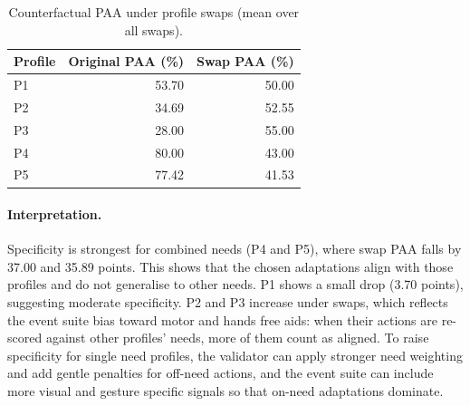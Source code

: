 \documentclass[openany]{book}
\begin{document}
\begin{table}[ht]
\centering
\caption{Counterfactual PAA under profile swaps (mean over all swaps).}
\label{tab:swap}
\begin{tabular}{lrr}
\toprule
\textbf{Profile} & \textbf{Original PAA (\%)} & \textbf{Swap PAA (\%)} \\
\midrule
P1 & 53.70 & 50.00 \\
P2 & 34.69 & 52.55 \\
P3 & 28.00 & 55.00 \\
P4 & 80.00 & 43.00 \\
P5 & 77.42 & 41.53 \\
\bottomrule
\end{tabular}
\end{table}

\paragraph{Interpretation.}
Specificity is strongest for combined needs (P4 and P5), where swap PAA falls by 37.00 and 35.89 points. This shows that the chosen adaptations align with those profiles and do not generalise to other needs. P1 shows a small drop (3.70 points), suggesting moderate specificity. P2 and P3 increase under swaps, which reflects the event suite bias toward motor and hands free aids: when their actions are re-scored against other profiles’ needs, more of them count as aligned. To raise specificity for single need profiles, the validator can apply stronger need weighting and add gentle penalties for off-need actions, and the event suite can include more visual and gesture specific signals so that on-need adaptations dominate.

\end{document}
